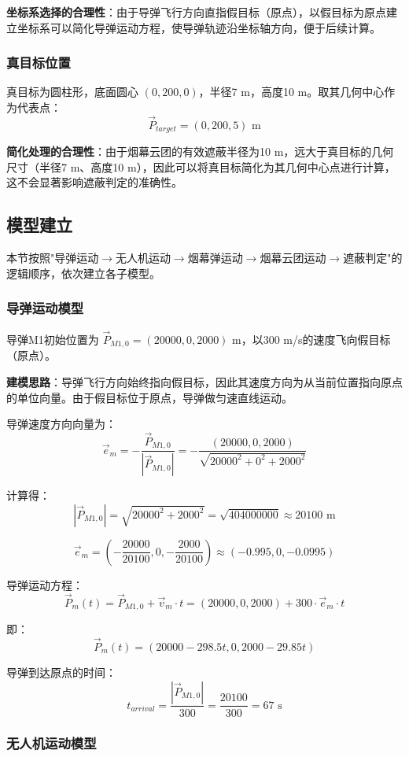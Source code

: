 \documentclass[12pt,a4paper]{article}
\begin{document}
\textbf{坐标系选择的合理性}：由于导弹飞行方向直指假目标（原点），以假目标为原点建立坐标系可以简化导弹运动方程，使导弹轨迹沿坐标轴方向，便于后续计算。

\subsubsection{真目标位置}
真目标为圆柱形，底面圆心 $(0, 200, 0)$，半径7 m，高度10 m。取其几何中心作为代表点：
$$\vec{P}_{target} = (0, 200, 5) \text{ m}$$

\textbf{简化处理的合理性}：由于烟幕云团的有效遮蔽半径为10 m，远大于真目标的几何尺寸（半径7 m、高度10 m），因此可以将真目标简化为其几何中心点进行计算，这不会显著影响遮蔽判定的准确性。

\subsection{模型建立}

本节按照"导弹运动$\rightarrow$无人机运动$\rightarrow$烟幕弹运动$\rightarrow$烟幕云团运动$\rightarrow$遮蔽判定"的逻辑顺序，依次建立各子模型。

\subsubsection{导弹运动模型}

导弹M1初始位置为 $\vec{P}_{M1,0} = (20000, 0, 2000)$ m，以300 m/s的速度飞向假目标（原点）。

\textbf{建模思路}：导弹飞行方向始终指向假目标，因此其速度方向为从当前位置指向原点的单位向量。由于假目标位于原点，导弹做匀速直线运动。

导弹速度方向向量为：
$$\vec{e}_m = -\frac{\vec{P}_{M1,0}}{|\vec{P}_{M1,0}|} = -\frac{(20000, 0, 2000)}{\sqrt{20000^2 + 0^2 + 2000^2}}$$

计算得：
$$|\vec{P}_{M1,0}| = \sqrt{20000^2 + 2000^2} = \sqrt{404000000} \approx 20100 \text{ m}$$

$$\vec{e}_m = \left(-\frac{20000}{20100}, 0, -\frac{2000}{20100}\right) \approx (-0.995, 0, -0.0995)$$

导弹运动方程：
$$\vec{P}_m(t) = \vec{P}_{M1,0} + \vec{v}_m \cdot t = (20000, 0, 2000) + 300 \cdot \vec{e}_m \cdot t$$

即：
$$\vec{P}_m(t) = (20000 - 298.5t, 0, 2000 - 29.85t)$$

导弹到达原点的时间：
$$t_{arrival} = \frac{|\vec{P}_{M1,0}|}{300} = \frac{20100}{300} = 67 \text{ s}$$

\subsubsection{无人机运动模型}
\end{document}
